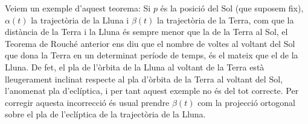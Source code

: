 \documentclass[../main.tex]{subfiles}
\begin{document}
\begin{ej}
Veiem un exemple d'aquest teorema: Si $p$ és la posició del Sol (que suposem fix), $\alpha(t)$ la trajectòria de la Lluna i $\beta(t)$ la trajectòria de la Terra, com que la distància de la Terra i la Lluna és sempre menor que la de la Terra al Sol, el Teorema de Rouché anterior ens diu que el nombre de voltes al voltant del Sol que dona la Terra en un determinat període de temps, és el mateix que el de la Lluna. De fet, el pla de l'òrbita de la Lluna al voltant de la Terra està lleugerament inclinat respecte al pla d'òrbita de la Terra al voltant del Sol, l'anomenat pla d'eclíptica, i per tant aquest exemple no és del tot correcte. Per corregir aquesta incorrecció és usual prendre $\beta(t)$ com la projecció ortogonal sobre el pla de l'eclíptica de la trajectòria de la Lluna.
\end{ej}
\end{document}
